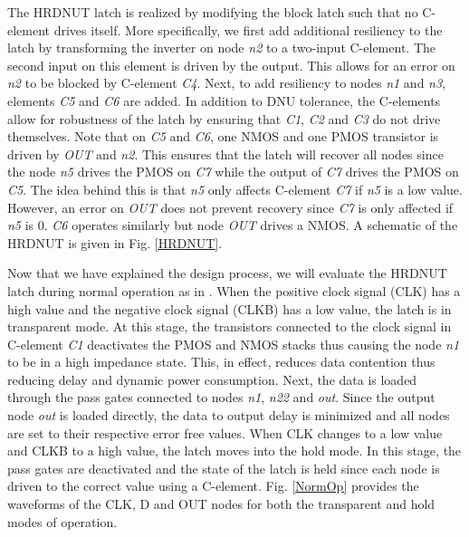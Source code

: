 The HRDNUT latch is realized by modifying the block latch such that no C-element drives itself. More specifically, we first add additional resiliency to the latch by transforming the inverter on node \textit{n2} to a two-input C-element. The second input on this element is driven by the output. This allows for an error on \textit{n2} to be blocked by C-element \textit{C4}. Next, to add resiliency to nodes \textit{n1} and \textit{n3}, elements \textit{C5} and \textit{C6} are added. In addition to DNU tolerance, the C-elements allow for robustness of the latch by ensuring that \textit{C1}, \textit{C2} and \textit{C3} do not drive themselves. Note that on \textit{C5} and \textit{C6}, one NMOS and one PMOS transistor is driven by \textit{OUT} and \textit{n2}. This ensures that the latch will recover all nodes since the node \textit{n5} drives the PMOS on \textit{C7} while the output of \textit{C7} drives the PMOS  on \textit{C5}. The idea behind this is that \textit{n5} only affects C-element \textit{C7} if \textit{n5} is a low value. However, an error on \textit{OUT} does not prevent recovery since \textit{C7} is only affected if \textit{n5} is 0. \textit{C6} operates similarly but node \textit{OUT} drives a NMOS. A schematic of the HRDNUT is given in Fig. \ref{HRDNUT}.

Now that we have explained the design process, we will evaluate the HRDNUT latch during normal operation as in \cite{Watkins2016}. When the positive clock signal (CLK) has a high value and the negative clock signal (CLKB) has a low value, the latch is in transparent mode. At this stage, the transistors connected to the clock signal in C-element \textit{C1} deactivates the PMOS and NMOS stacks thus causing the node \textit{n1} to be in a high impedance state. This, in effect, reduces data contention thus reducing delay and dynamic power consumption. Next, the data is loaded through the pass gates connected to nodes \textit{n1}, \textit{n22} and \textit{out}. Since the output node \textit{out} is loaded directly, the data to output delay is minimized and all nodes are set to their respective error free values. When CLK changes to a low value and CLKB to a high value, the latch moves into the hold mode. In this stage, the pass gates are deactivated and the state of the latch is held since each node is driven to the correct value using a C-element. Fig. \ref{NormOp} provides the waveforms of the CLK, D and OUT nodes for both the transparent and hold modes of operation.

